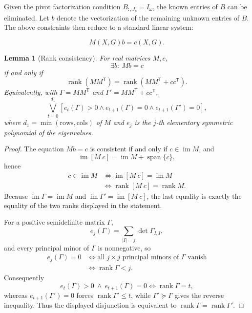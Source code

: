 \documentclass[journal]{IEEEtran}
\theoremstyle{plainn}
\newtheorem{lem}[thm]{Lemma}
\theoremstyle{remark}
\begin{document}
Given the pivot factorization condition $B_{:,J_p}=I_\omega$, the known entries of 
$B$ can be eliminated. Let $b$ denote the vectorization of the remaining unknown entries of $B$. The above constraints then reduce to a standard linear system:


\begin{equation*}
M(X,G)b=c(X,G).
\end{equation*}

\begin{lem}[Rank consistency]\label{lem:rankcons}
	For real matrices $M,c$,
	\[
	\exists b:\ Mb=c
	\]
	if and only if
	\[
	\operatorname{rank}(MM^{\mathsf T})
	=\operatorname{rank}(MM^{\mathsf T}+cc^{\mathsf T}).
	\]
	Equivalently, with $\Gamma=MM^{\mathsf T}$ and
	$\Gamma'=MM^{\mathsf T}+cc^{\mathsf T}$,
	\[
	\bigvee_{t=0}^{d_1}
	\left[e_t(\Gamma)>0\wedge e_{t+1}(\Gamma)=0\wedge e_{t+1}(\Gamma')=0\right],
	\]
	where $d_1=\min(\text{rows},\text{cols})$ of $M$ and $e_j$ is the
	$j$-th elementary symmetric polynomial of the eigenvalues.
\end{lem}

\begin{proof}
	The equation $Mb=c$ is consistent if and only if
	$c\in\operatorname{im}M$, and
	\[
	\operatorname{im}[M\ c]=\operatorname{im}M+\operatorname{span}\{c\},
	\]
	hence
	\[
	\begin{aligned}
	c\in\operatorname{im}M
	&\iff \operatorname{im}[M\ c]=\operatorname{im}M\\
	&\iff \operatorname{rank}[M\ c]=\operatorname{rank}M .
	\end{aligned}
	\]
	Because $\operatorname{im}\Gamma=\operatorname{im}M$ and
	$\operatorname{im}\Gamma'=\operatorname{im}[M\ c]$, the last equality
	is exactly the equality of the two ranks displayed in the statement.

	For a positive semidefinite matrix $\Gamma$,
	\[
	e_j(\Gamma)=\sum_{|I|=j}\det\Gamma_{I,I},
	\]
	and every principal minor of $\Gamma$ is nonnegative, so
	\[
	\begin{aligned}
	e_j(\Gamma)=0
	&\iff \text{all } j\times j \text{ principal minors of } \Gamma
	\text{ vanish}\\
	&\iff \operatorname{rank}\Gamma<j .
	\end{aligned}
	\]
	Consequently
	\[
	e_t(\Gamma)>0\ \wedge\ e_{t+1}(\Gamma)=0
	\iff \operatorname{rank}\Gamma=t ,
	\]
	whereas $e_{t+1}(\Gamma')=0$ forces $\operatorname{rank}\Gamma'\le t$,
	while $\Gamma'\succeq\Gamma$ gives the reverse inequality. Thus the
	displayed disjunction is equivalent to
	$\operatorname{rank}\Gamma=\operatorname{rank}\Gamma'$.
\end{proof}
\end{document}

